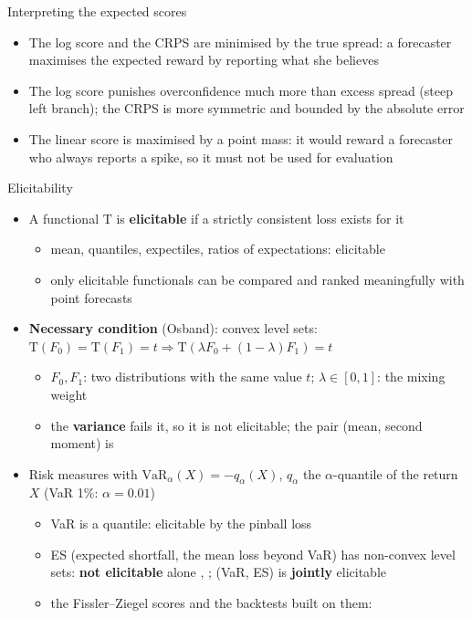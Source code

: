 \begin{frame}{Interpreting the expected scores}
\itemsize{\small}
\begin{itemize}
    \item The log score and the CRPS are minimised by the true spread: a forecaster maximises the expected reward by reporting what she believes
    \item The log score punishes overconfidence much more than excess spread (steep left branch); the CRPS is more symmetric and bounded by the absolute error
    \item The linear score is maximised by a point mass: it would reward a forecaster who always reports a spike, so it must not be used for evaluation
\end{itemize}
\end{frame}

\begin{frame}{Elicitability}
\itemsize{\small}
\begin{itemize}
    \item A functional $\mathrm T$ is \textbf{elicitable} if a strictly consistent loss exists for it 
    \begin{itemize}
        \item mean, quantiles, expectiles, ratios of expectations: elicitable
        \item only elicitable functionals can be compared and ranked meaningfully with point forecasts
    \end{itemize}
    \item \textbf{Necessary condition} (Osband): convex level sets: $\mathrm T(F_0) = \mathrm T(F_1) = t \Rightarrow \mathrm T(\lambda F_0 + (1 - \lambda)F_1) = t$
    \begin{itemize}
        \item $F_0, F_1$: two distributions with the same value $t$; $\lambda \in [0,1]$: the mixing weight
        \item the \textbf{variance} fails it, so it is not elicitable; the pair (mean, second moment) is
    \end{itemize}
    \item Risk measures with $\mathrm{VaR}_\alpha(X) = -q_\alpha(X)$, $q_\alpha$ the $\alpha$-quantile of the return $X$ (VaR 1\%: $\alpha = 0.01$)
    \begin{itemize}
        \item VaR is a quantile: elicitable by the pinball loss
        \item ES (expected shortfall, the mean loss beyond VaR) has non-convex level sets: \textbf{not elicitable} alone , ; (VaR, ES) is \textbf{jointly} elicitable 
        \item the Fissler--Ziegel scores and the backtests built on them: 
    \end{itemize}
\end{itemize}
\end{frame}

